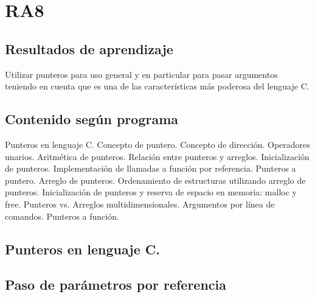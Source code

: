 \section{RA8}
\subsection*{Resultados de aprendizaje}
Utilizar punteros para uso general y en particular para pasar argumentos teniendo en cuenta que es una de las características más poderosa del lenguaje C.

\subsection*{Contenido según programa}
Punteros en lenguaje C.  Concepto de puntero.  Concepto de dirección.  Operadores unarios.  Aritmética de punteros.  Relación entre punteros y arreglos. Inicialización de punteros. Implementación de llamadas a función por referencia. Punteros a puntero. Arreglo de punteros. Ordenamiento de estructuras utilizando arreglo de punteros.  Inicialización de punteros y reserva de espacio en memoria: malloc y free.  Punteros vs. Arreglos multidimensionales.  Argumentos por línea de comandos. Punteros a función.

\setcounter{subsection}{8}
\subsection*{Punteros en lenguaje C.}

\subsection*{Paso de parámetros por referencia}

